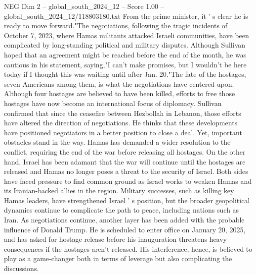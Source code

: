 \begin{textsample}{NEG Dim 2 – global\_south\_2024\_12 – Score 1.00 – global\_south\_2024\_12/118803180.txt}
From the prime minister, it ' s clear he is ready to move forward."The negotiations, following the tragic incidents of October 7, 2023, where Hamas militants attacked Israeli communities, have been complicated by long-standing political and military disputes.
Although Sullivan hoped that an agreement might be reached before the end of the month, he was cautious in his statement, saying,"I can't make promises, but I wouldn't be here today if I thought this was waiting until after Jan. 20."The fate of the hostages, seven Americans among them, is what the negotiations have centered upon.
Although four hostages are believed to have been killed, efforts to free those hostages have now become an international focus of diplomacy.
Sullivan confirmed that since the ceasefire between Hezbollah in Lebanon, those efforts have altered the direction of negotiations.
He thinks that these developments have positioned negotiators in a better position to close a deal.
Yet, important obstacles stand in the way.
Hamas has demanded a wider resolution to the conflict, requiring the end of the war before releasing all hostages.
On the other hand, Israel has been adamant that the war will continue until the hostages are released and Hamas no longer poses a threat to the security of Israel.
Both sides have faced pressure to find common ground as Israel works to weaken Hamas and its Iranian-backed allies in the region.
Military successes, such as killing key Hamas leaders, have strengthened Israel ' s position, but the broader geopolitical dynamics continue to complicate the path to peace, including nations such as Iran.
As negotiations continue, another layer has been added with the probable influence of Donald Trump.
He is scheduled to enter office on January 20, 2025, and has asked for hostage release before his inauguration threatens heavy consequences if the hostages aren't released.
His interference, hence, is believed to play as a game-changer both in terms of leverage but also complicating the discussions.

\end{textsample}
